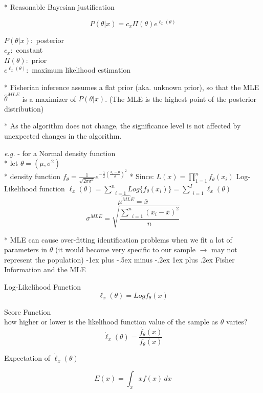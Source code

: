 \documentclass[10pt,landscape]{article}
\makeatletter
\renewcommand{\subsubsection}{\@startsection{subsubsection}{3}{0mm}%
                                {-1ex plus -.5ex minus -.2ex}%
                                {1ex plus .2ex}%
                                {\normalfont\small\bfseries}}
\makeatother
\begin{document}
\begin{multicols}{3}
* Reasonable Bayesian justification
\begin{multicols}{2}
$$ P(\theta | x) = c_x \Pi(\theta) e^{\ell_x(\theta)} $$

\pagebreak 
$P(\theta | x):$ posterior \\
$c_x:$ constant \\
$\Pi(\theta):$ prior \\
$e^{\ell_x(\theta)}:$ maximum likelihood estimation
\end{multicols}

* Fisherian inference assumes a flat prior (aka. unknown prior), so that the MLE $\hat{\theta}^{MLE}$ is a maximizer of $P(\theta | x)$. (The MLE is the highest point of the posterior distribution)

* As the algorithm does not change, the significance level is not affected by unexpected changes in the algorithm.

\medskip 
\emph{e.g.} - for a Normal density function\\
* let $\theta = (\mu, \sigma^2)$ \\
* density function $f_{\theta} = \frac{1}{\sqrt{2 \pi \sigma^2}} e^{-\frac{1}{2} \left(\frac{x_i - \mu}{\sigma}\right)^2}$
* Since: $L(x) = \prod _{1=1}^n f_{\theta}(x_i)$
Log-Likelihood function $\ell_x(\theta) = \underset{i=1}{\overset{n}{\sum}} Log\{f_{\theta}(x_i)\} = \underset{i=1}{\overset{I}{\sum}} \ell_x(\theta)$
$$ \hat{\mu^{MLE}} = \bar{x} $$
$$ \sigma^{MLE} = \sqrt{\frac{\underset{i=1}{\overset{n}{\sum}} (x_i - \bar{x})^2}{n}} $$

* MLE can cause over-fitting identification problems when we fit a lot of parameters in $\theta$ (it would become very specific to our sample $\rightarrow$ may not represent the population)
\subsubsection{Fisher Information and the MLE}

Log-Likelihood Function
$$ \ell_x(\theta) = Log f_{\theta}(x) $$

Score Function \\
how higher or lower is the likelihood function value of the sample as $\theta$ varies?
$$ \dot{\ell}_x(\theta) = \frac{\dot{f_{\theta}}(x)}{f_{\theta}(x)} $$

Expectation of $\dot{\ell}_x(\theta)$
\begin{multicols}{2}
$$ E(x) = \int_x x f(x)\, dx $$


\end{multicols}
\end{multicols}
\end{document}

